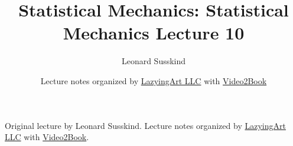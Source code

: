 \documentclass[11pt,oneside]{book}
\begin{document}
\frontmatter
\title{Statistical Mechanics: Statistical Mechanics Lecture 10}
\author{Leonard Susskind}
\date{Lecture notes organized by \href{https://lazying.art}{LazyingArt LLC} with \href{https://github.com/lachlanchen/Video2Book}{Video2Book}}
\maketitle
\begin{center}
\small Original lecture by Leonard Susskind. Lecture notes organized by \href{https://lazying.art}{LazyingArt LLC} with \href{https://github.com/lachlanchen/Video2Book}{Video2Book}.
\end{center}
\clearpage
\mainmatter

\end{document}
